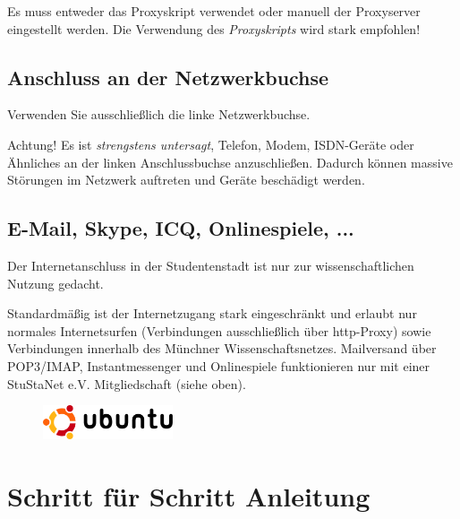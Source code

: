 \documentclass[a4paper,12pt]{scrartcl}
\begin{document}
Es muss entweder das Proxyskript verwendet oder manuell der Proxyserver eingestellt werden. Die Verwendung des \emph{Proxyskripts} wird stark empfohlen!

\subsection*{Anschluss an der Netzwerkbuchse}

Verwenden Sie ausschließlich die linke Netzwerkbuchse. 

Achtung! Es ist \emph{strengstens untersagt}, Telefon, Modem, ISDN-Geräte oder Ähnliches an der linken Anschlussbuchse anzuschließen. Dadurch können massive Störungen im Netzwerk auftreten und Geräte beschädigt werden. 

\subsection*{E-Mail, Skype, ICQ, Onlinespiele, ...}

Der Internetanschluss in der Studentenstadt ist nur zur wissenschaftlichen Nutzung gedacht.

Standardmäßig ist der Internetzugang stark eingeschränkt und erlaubt nur normales Internetsurfen (Verbindungen ausschließlich über http-Proxy) sowie Verbindungen innerhalb des Münchner Wissenschaftsnetzes. Mailversand über POP3/IMAP, Instantmessenger und Onlinespiele funktionieren nur mit einer StuStaNet e.V. Mitgliedschaft (siehe oben).


\newpage
\enlargethispage{20pt}

\begin{figure}[t!]
    \raggedleft
    \vspace{-20pt}
    \includegraphics[height=1cm,keepaspectratio]{Bilder/Ubuntu_logo}
    \vspace{-20pt}
\end{figure}

\section*{Schritt für Schritt Anleitung}
\end{document}
